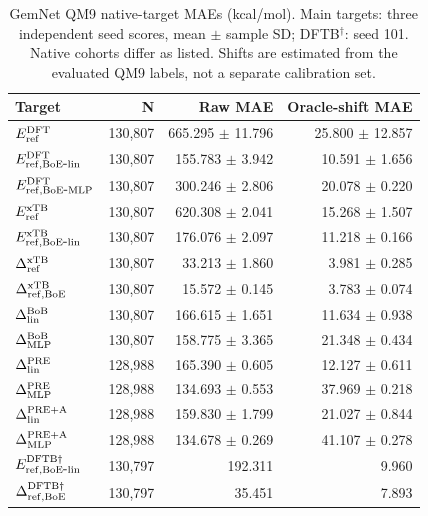 \begin{table}[H]
\centering
\scriptsize
\setlength{\tabcolsep}{4pt}
\renewcommand{\arraystretch}{1.35}
\caption{GemNet QM9 native-target MAEs (kcal/mol). Main targets: three independent seed scores, mean $\pm$ sample SD; DFTB$^\dagger$: seed 101. Native cohorts differ as listed. Shifts are estimated from the evaluated QM9 labels, not a separate calibration set.}
\begin{tabular}{lrrr}
\toprule
Target & N & Raw MAE & Oracle-shift MAE \\
\midrule
\(E_{\rm ref}^{\rm DFT}\) & 130,807 & 665.295 $\pm$ 11.796 & 25.800 $\pm$ 12.857 \\
\(E_{\rm ref,BoE\mbox{-}lin}^{\rm DFT}\) & 130,807 & 155.783 $\pm$ 3.942 & 10.591 $\pm$ 1.656 \\
\(E_{\rm ref,BoE\mbox{-}MLP}^{\rm DFT}\) & 130,807 & 300.246 $\pm$ 2.806 & 20.078 $\pm$ 0.220 \\
\(E_{\rm ref}^{\rm xTB}\) & 130,807 & 620.308 $\pm$ 2.041 & 15.268 $\pm$ 1.507 \\
\(E_{\rm ref,BoE\mbox{-}lin}^{\rm xTB}\) & 130,807 & 176.076 $\pm$ 2.097 & 11.218 $\pm$ 0.166 \\
\(\Delta^{\rm xTB}_{\rm ref}\) & 130,807 & 33.213 $\pm$ 1.860 & 3.981 $\pm$ 0.285 \\
\(\Delta^{\rm xTB}_{\rm ref,BoE}\) & 130,807 & 15.572 $\pm$ 0.145 & 3.783 $\pm$ 0.074 \\
\(\Delta^{\rm BoB}_{\rm lin}\) & 130,807 & 166.615 $\pm$ 1.651 & 11.634 $\pm$ 0.938 \\
\(\Delta^{\rm BoB}_{\rm MLP}\) & 130,807 & 158.775 $\pm$ 3.365 & 21.348 $\pm$ 0.434 \\
\(\Delta^{\rm PRE}_{\rm lin}\) & 128,988 & 165.390 $\pm$ 0.605 & 12.127 $\pm$ 0.611 \\
\(\Delta^{\rm PRE}_{\rm MLP}\) & 128,988 & 134.693 $\pm$ 0.553 & 37.969 $\pm$ 0.218 \\
\(\Delta^{\rm PRE+A}_{\rm lin}\) & 128,988 & 159.830 $\pm$ 1.799 & 21.027 $\pm$ 0.844 \\
\(\Delta^{\rm PRE+A}_{\rm MLP}\) & 128,988 & 134.678 $\pm$ 0.269 & 41.107 $\pm$ 0.278 \\
\(E_{\rm ref,BoE\mbox{-}lin}^{\rm DFTB\dagger}\) & 130,797 & 192.311 & 9.960 \\
\(\Delta^{\rm DFTB\dagger}_{\rm ref,BoE}\) & 130,797 & 35.451 & 7.893 \\
\bottomrule
\end{tabular}
\end{table}

